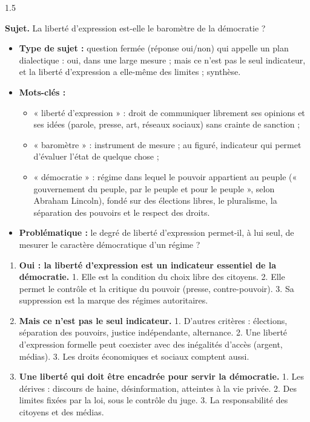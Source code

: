 \documentclass[12pt]{article}
\begin{document}
\begin{spacing}{1.5}

\noindent\textbf{Sujet.} La liberté d'expression est-elle le baromètre de la démocratie ?


\begin{itemize}
\item \textbf{Type de sujet :} question fermée (réponse oui/non) qui appelle un plan dialectique : oui, dans une large mesure ; mais ce n'est pas le seul indicateur, et la liberté d'expression a elle-même des limites ; synthèse.
\item \textbf{Mots-clés :}
  \begin{itemize}
  \item « liberté d'expression » : droit de communiquer librement ses opinions et ses idées (parole, presse, art, réseaux sociaux) sans crainte de sanction ;
  \item « baromètre » : instrument de mesure ; au figuré, indicateur qui permet d'évaluer l'état de quelque chose ;
  \item « démocratie » : régime dans lequel le pouvoir appartient au peuple (« gouvernement du peuple, par le peuple et pour le peuple », selon Abraham Lincoln), fondé sur des élections libres, le pluralisme, la séparation des pouvoirs et le respect des droits.
  \end{itemize}
\item \textbf{Problématique :} le degré de liberté d'expression permet-il, à lui seul, de mesurer le caractère démocratique d'un régime ?
\end{itemize}


\begin{enumerate}
\item[I.] \textbf{Oui : la liberté d'expression est un indicateur essentiel de la démocratie.} 1. Elle est la condition du choix libre des citoyens. 2. Elle permet le contrôle et la critique du pouvoir (presse, contre-pouvoir). 3. Sa suppression est la marque des régimes autoritaires.
\item[II.] \textbf{Mais ce n'est pas le seul indicateur.} 1. D'autres critères : élections, séparation des pouvoirs, justice indépendante, alternance. 2. Une liberté d'expression formelle peut coexister avec des inégalités d'accès (argent, médias). 3. Les droits économiques et sociaux comptent aussi.
\item[III.] \textbf{Une liberté qui doit être encadrée pour servir la démocratie.} 1. Les dérives : discours de haine, désinformation, atteintes à la vie privée. 2. Des limites fixées par la loi, sous le contrôle du juge. 3. La responsabilité des citoyens et des médias.
\end{enumerate}


\end{spacing}
\end{document}
